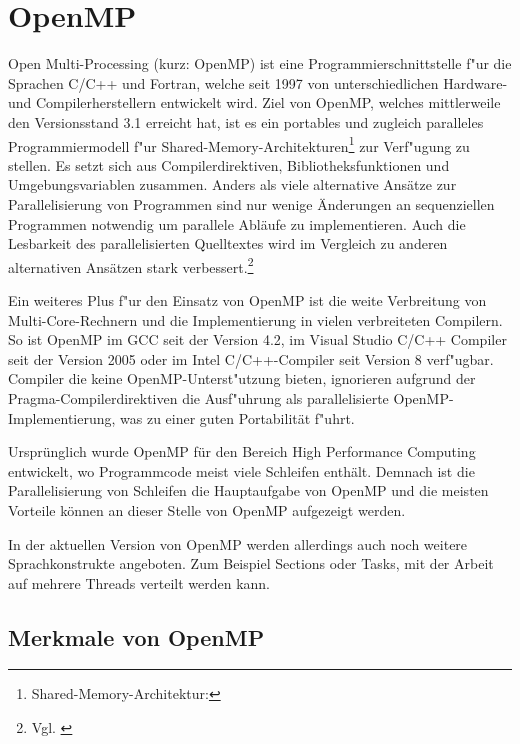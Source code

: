 \documentclass[11pt]{scrartcl}
\begin{document}
\pagebreak

\pagestyle{fancy}
\setcounter{page}{1} 

\section{OpenMP} Open Multi-Processing (kurz: OpenMP) ist eine Programmierschnittstelle
f"ur die Sprachen C/C++ und Fortran, welche seit 1997 von unterschiedlichen Hardware- und Compilerherstellern
entwickelt wird. Ziel von OpenMP, welches mittlerweile den Versionsstand 3.1 erreicht hat, ist es ein portables und zugleich paralleles
Programmiermodell f"ur Shared-Memory-Architekturen\footnote{Shared-Memory-Architektur: } zur Verf"ugung zu stellen. Es setzt sich aus Compilerdirektiven, Bibliotheksfunktionen und Umgebungsvariablen zusammen. Anders als viele alternative Ansätze zur Parallelisierung von Programmen sind nur wenige Änderungen an sequenziellen Programmen notwendig um parallele Abläufe zu implementieren. Auch die Lesbarkeit des parallelisierten Quelltextes wird im Vergleich zu anderen alternativen Ansätzen stark verbessert.\footnote{Vgl. \cite{openmp08} }

Ein weiteres Plus f"ur den Einsatz von OpenMP ist die weite Verbreitung von Multi-Core-Rechnern und die Implementierung in vielen verbreiteten Compilern. So ist OpenMP im GCC seit der Version 4.2, im Visual Studio C/C++ Compiler seit der Version 2005 oder im Intel C/C++-Compiler seit Version 8 verf"ugbar. Compiler die keine OpenMP-Unterst"utzung bieten, ignorieren aufgrund der Pragma-Compilerdirektiven die Ausf"uhrung als parallelisierte OpenMP-Implementierung, was zu einer guten Portabilität f"uhrt.

Ursprünglich wurde OpenMP für den Bereich High Performance Computing entwickelt, wo Programmcode meist viele Schleifen enthält. Demnach ist die Parallelisierung von Schleifen die Hauptaufgabe von OpenMP und die meisten Vorteile können an dieser Stelle von OpenMP aufgezeigt werden. 

In der aktuellen Version von OpenMP werden allerdings auch noch weitere Sprachkonstrukte angeboten. Zum Beispiel Sections oder Tasks, mit der Arbeit auf mehrere Threads verteilt werden kann.

\subsection{Merkmale von OpenMP}
\end{document}
